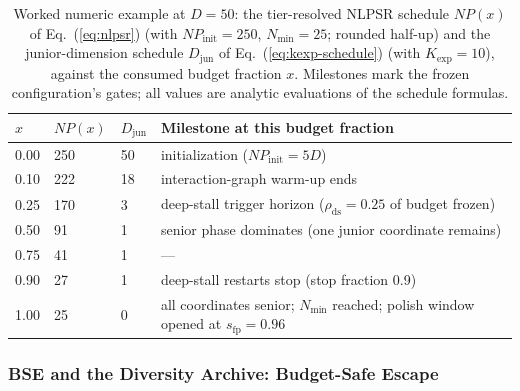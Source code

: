 \begin{table}[H]
\caption{Worked numeric example at $D=50$: the tier-resolved NLPSR
schedule $NP(x)$ of Eq.~(\ref{eq:nlpsr}) (with $NP_{\text{init}}=250$,
$N_{\min}=25$; rounded half-up) and the junior-dimension schedule
$D_{\text{jun}}$ of Eq.~(\ref{eq:kexp-schedule}) (with
$K_{\exp}=10$), against the consumed budget fraction $x$. Milestones
mark the frozen configuration's gates; all values are analytic
evaluations of the schedule formulas.}
\label{tab:worked-example}
\centering
\small
\begin{tabular}{llll}
\toprule
$x$ & $NP(x)$ & $D_{\text{jun}}$ & Milestone at this budget fraction\\
\midrule
0.00 & 250 & 50 & initialization ($NP_{\text{init}}=5D$)\\
0.10 & 222 & 18 & interaction-graph warm-up ends\\
0.25 & 170 & 3  & deep-stall trigger horizon ($\rho_{\text{ds}}=0.25$ of budget frozen)\\
0.50 & 91  & 1  & senior phase dominates (one junior coordinate remains)\\
0.75 & 41  & 1  & ---\\
0.90 & 27  & 1  & deep-stall restarts stop (stop fraction 0.9)\\
1.00 & 25  & 0  & all coordinates senior; $N_{\min}$ reached; polish window opened at $s_{\text{fp}}=0.96$\\
\bottomrule
\end{tabular}
\end{table}

\subsubsection{BSE and the Diversity Archive: Budget-Safe Escape}\label{sec:alg:bse}

